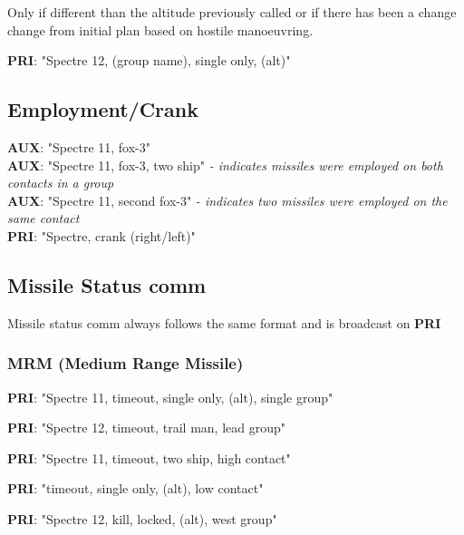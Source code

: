 Only if different than the altitude previously called or if there has been a
change change from initial plan based on hostile manoeuvring.

\textbf{PRI}: "Spectre 12, (group name), single only, (alt)"

\subsection*{Employment/Crank}

\textbf{AUX}: "Spectre 11, fox-3" \\
\textbf{AUX}: "Spectre 11, fox-3, two ship" \textit{- indicates missiles were
employed on both contacts in a group} \\
\textbf{AUX}: "Spectre 11, second fox-3" \textit{- indicates two missiles were
employed on the same contact} \\
\textbf{PRI}: "Spectre, crank (right/left)"

\subsection*{Missile Status comm}

Missile status comm always follows the same format and is broadcast on
\textbf{PRI}


\subsubsection*{MRM (Medium Range Missile)}

\textbf{PRI}: "Spectre 11, timeout, single only, (alt), single group"

\textbf{PRI}: "Spectre 12, timeout, trail man, lead group"


\textbf{PRI}: "Spectre 11, timeout, two ship, high contact"

\textbf{PRI}: "timeout, single only, (alt), low contact"

\textbf{PRI}: "Spectre 12, kill, locked, (alt), west group"

